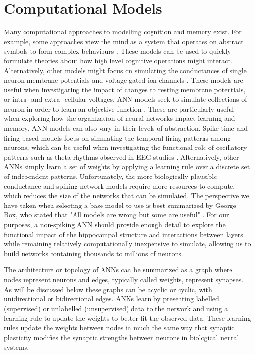 \section{Computational Models}
\label{comp-model}
Many computational approaches to modelling cognition and memory exist. 
For example, some approaches view the mind as a system that operates on abstract 
symbols to form complex behaviours \citep{turing-50, searle-80}. 
These models can be used to quickly formulate theories about how high level 
cognitive operations might interact.
Alternatively, other models might focus on simulating the conductances of single neuron 
membrane potentials and voltage-gated ion channels \citep{hodgkin-huxley}. 
These models are useful when investigating the impact of changes to 
resting membrane potentials, or intra- and extra- cellular voltages.
\ac{ANN} models seek to simulate collections of neuron in order to learn an objective 
function \citep {hebb, perceptrons-62, PDP-v1, PDP-v2}. 
These are particularly useful when exploring how the organization of neural networks 
impact learning and memory.
\ac{ANN} models can also vary in their levels of abstraction.
Spike time and firing based 
models focus on simulating the temporal firing patterns among neurons, which can be useful when  
investigating the functional role of oscillatory patterns such as theta rhythms observed in EEG studies
\citep{integrate-fire-neurons}.
Alternatively, other \acp{ANN} simply learn a set of weights by applying a learning rule over 
a discrete set of independent patterns.
Unfortunately, the more biologically plausible conductance and spiking network models require more 
resources to compute, which reduces the size of the networks that can be simulated.
The perspective we have taken when selecting a base model to use is best summarized by George Box, 
who stated that "All models are wrong but some are useful" \citep{box-87}.
For our purposes, a non-spiking \ac{ANN} should provide enough detail to explore 
the functional impact of the hippocampal structure and interactions between layers while remaining relatively 
computationally inexpensive to simulate, allowing us to build networks containing 
thousands to millions of neurons.

The architecture or topology of \acp{ANN} can be summarized as 
a graph where nodes represent neurons and 
edges, typically called weights, represent synapses. 
As will be discussed below these graphs can 
be acyclic or cyclic, with unidirectional or bidirectional edges. 
\acp{ANN} learn by presenting labelled (supervised) or 
unlabelled (unsupervised) data to the network and using a learning rule 
to update the weights to better fit the observed data.
These learning rules update the weights between nodes in much 
the same way that synaptic plasticity 
modifies the synaptic strengths between neurons in 
biological neural systems.

